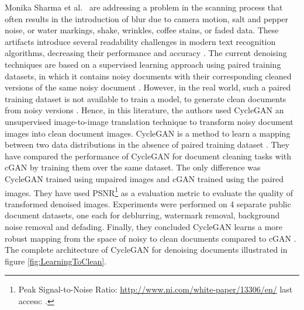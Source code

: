 Monika Sharma et al.\ \cite{sharma2019learning} are addressing a problem in the scanning process that often results in the introduction of blur due to camera motion, salt and pepper noise, or water markings, shake, wrinkles, coffee stains, or faded data. These artifacts introduce several readability challenges in modern text recognition algorithms, decreasing their performance and accuracy \cite{sharma2019learning}. The current denoising techniques are based on a supervised learning approach using paired training datasets, in which it contains noisy documents with their corresponding cleaned versions of the same noisy document \cite{sharma2019learning}. However, in the real world, such a paired training dataset is not available to train a model, to generate clean documents from noisy versions \cite{zhu2020unpaired}\cite{sharma2019learning}. Hence, in this literature, the authors used \ac{CycleGAN} an unsupervised image-to-image translation technique to transform noisy document images into clean document images. \ac{CycleGAN} is a method to learn a mapping between two data distributions in the absence of paired training dataset \cite{zhu2020unpaired} \cite{sharma2019learning}. They have compared the performance of \ac{CycleGAN} for document cleaning tasks with \ac{cGAN} by training them over the same dataset. The only difference was \ac{CycleGAN} trained using unpaired images and \ac{cGAN} trained using the paired images. They have used \ac{PSNR}\footnote{Peak Signal-to-Noise Ratio: \url{http://www.ni.com/white-paper/13306/en/} last access: \dcdate.} as a evaluation metric to evaluate the quality of transformed denoised images. Experiments were performed on 4 separate public document datasets, one each for deblurring, watermark removal, background noise removal and defading. Finally, they concluded \ac{CycleGAN} learns a more robust mapping from the space of noisy to clean documents compared to \ac{cGAN} \cite{sharma2019learning}. The complete architecture of \ac{CycleGAN} for denoising documents illustrated in figure \ref{fig:LearningToClean}.



